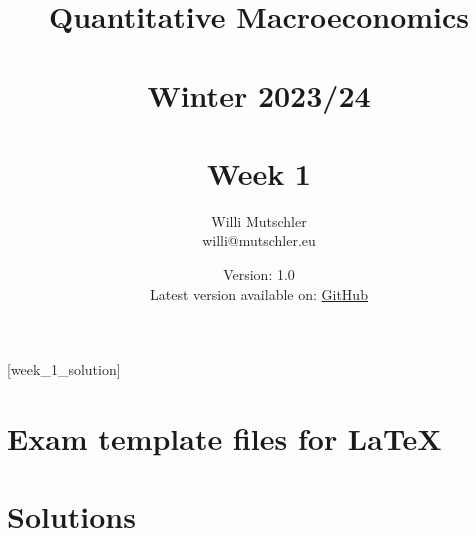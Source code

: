 
\newif\ifDisplaySolutions\DisplaySolutionstrue


\title{Quantitative Macroeconomics\\~\\Winter 2023/24\\~\\Week 1}
\author{Willi Mutschler\\willi@mutschler.eu}
\date{Version: 1.0\\Latest version available on: \href{https://github.com/wmutschl/Quantitative-Macroeconomics/releases/latest/download/week_1.pdf}{GitHub}}
\maketitle\thispagestyle{empty}

\newpage
{}[week_1_solution]
\tableofcontents\thispagestyle{empty}\newpage

\setcounter{page}{1}
\newpage
\newpage
\newpage
\newpage
\printbibliography
\newpage
\appendix
\section{Exam template files for \LaTeX}




\ifDisplaySolutions
\newpage
\section{Solutions}

\fi
